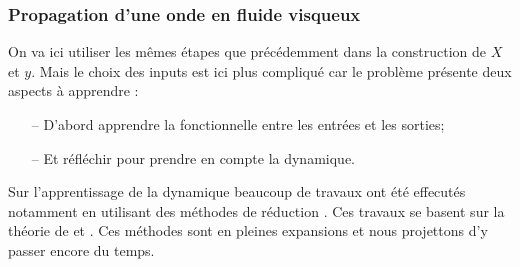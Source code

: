 \documentclass[a4paper,12pt]{article}
\newcommand\bk{\color{black}}
\newcommand\dsb{\color{dsb}}
\numberwithin{equation}{section} %
\begin{document}


\pagebreak

\dsb \subsubsection{Propagation d'une onde en fluide visqueux} \bk
\noindent On va ici utiliser les mêmes étapes que précédemment dans la construction de $X$ et $y$. Mais le choix des inputs est ici plus compliqué car le problème présente deux aspects à apprendre : 
\begin{itemize}[leftmargin=5mm]
\item[--] D'abord apprendre la fonctionnelle entre les entrées et les sorties;
\item[--] Et réfléchir pour prendre en compte la dynamique.
\end{itemize}   
Sur l'apprentissage de la dynamique beaucoup de travaux ont été effecutés notamment en utilisant des méthodes de réduction \citep{parish2016reduced}. Ces travaux se basent sur la théorie de \citep{chorin2002optimal} et \citep{tsung1995phase}. Ces méthodes sont en pleines expansions et nous projettons d'y passer encore du temps.\\
\end{document}
